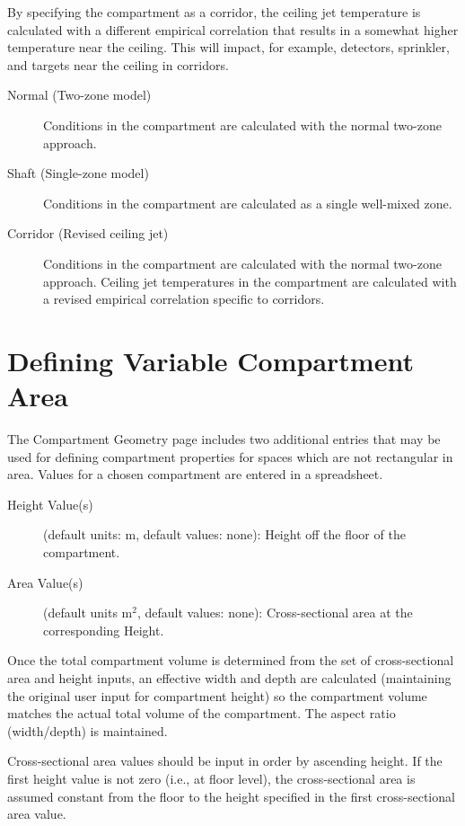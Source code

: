 By specifying the compartment as a corridor, the ceiling jet temperature is calculated with a different empirical correlation that results in a somewhat higher temperature near the ceiling.  This will impact, for example, detectors, sprinkler, and targets near the ceiling in corridors.

\begin{description}
\item[Normal (Two-zone model)] Conditions in the compartment are calculated with the normal two-zone approach.

\item[Shaft (Single-zone model)] Conditions in the compartment are calculated as a single well-mixed zone.

\item[Corridor (Revised ceiling jet)] Conditions in the compartment are calculated with the normal two-zone approach. Ceiling jet temperatures in the compartment are calculated with a revised empirical correlation specific to corridors.
\end{description}


\section{Defining Variable Compartment Area}

The Compartment Geometry page includes two additional entries that may be used for defining compartment properties for spaces which are not rectangular in area.  Values for a chosen compartment are entered in a spreadsheet.
\begin{description}
\item[Height Value(s)] (default units: m, default values: none): Height off the floor of the compartment.
\item[Area Value(s)] (default units m$^2$, default values: none): Cross-sectional area at the corresponding Height.
\end{description}
Once the total compartment volume is determined from the set of cross-sectional area and height inputs, an effective width and depth are calculated (maintaining the original user input for compartment height) so the compartment volume matches the actual total volume of the compartment. The aspect ratio (width/depth) is maintained.

Cross-sectional area values should be input in order by ascending height. If the first height value is not zero (i.e., at floor level), the cross-sectional area is assumed constant from the floor to the height specified in the first cross-sectional area value.

